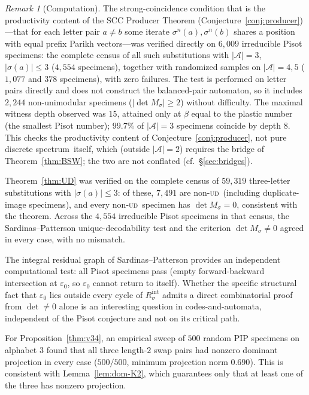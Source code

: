 \documentclass[11pt]{article}
\theoremstyle{plain}
\theoremstyle{definition}
\theoremstyle{remark}
\newtheorem{remark}[theorem]{Remark}
\newcommand{\UD}{\textsc{ud}}
\newcommand{\PDS}{pure discrete spectrum}
\newcommand{\A}{\mathcal{A}}
\begin{document}
\begin{remark}[Computation]\label{rem:computation}
The strong-coincidence condition that is the productivity content of the SCC Producer Theorem (Conjecture~\ref{conj:producer})---that for each letter pair $a\ne b$ some iterate $\sigma^n(a),\sigma^n(b)$ shares a position with equal prefix Parikh vectors---was verified directly on $6{,}009$ irreducible Pisot specimens: the complete census of all such substitutions with $|\A|=3$, $|\sigma(a)|\le 3$ ($4{,}554$ specimens), together with randomized samples on $|\A|=4,5$ ($1{,}077$ and $378$ specimens), with zero failures. The test is performed on letter pairs directly and does not construct the balanced-pair automaton, so it includes $2{,}244$ non-unimodular specimens ($|\det M_\sigma|\ge 2$) without difficulty. The maximal witness depth observed was $15$, attained only at $\beta$ equal to the plastic number (the smallest Pisot number); $99.7\%$ of $|\A|=3$ specimens coincide by depth $8$. This checks the productivity content of Conjecture~\ref{conj:producer}, not \PDS\ itself, which (outside $|\A|=2$) requires the bridge of Theorem~\ref{thm:BSW}; the two are not conflated (cf.\ \S\ref{sec:bridges}).

Theorem~\ref{thm:UD} was verified on the complete census of $59{,}319$ three-letter substitutions with $|\sigma(a)|\le 3$: of these, $7{,}491$ are non-\UD\ (including duplicate-image specimens), and every non-\UD\ specimen has $\det M_\sigma=0$, consistent with the theorem. Across the $4{,}554$ irreducible Pisot specimens in that census, the Sardinas--Patterson unique-decodability test and the criterion $\det M_\sigma\ne 0$ agreed in every case, with no mismatch.

The integral residual graph of Sardinas--Patterson provides an independent computational test: all Pisot specimens pass (empty forward-backward intersection at $\varepsilon_0$, so $\varepsilon_0$ cannot return to itself). Whether the specific structural fact that $\varepsilon_0$ lies outside every cycle of $R^{\mathrm{int}}_\sigma$ admits a direct combinatorial proof from $\det\ne 0$ alone is an interesting question in codes-and-automata, independent of the Pisot conjecture and not on its critical path.

For Proposition~\ref{thm:v34}, an empirical sweep of $500$ random PIP specimens on alphabet $3$ found that all three length-$2$ swap pairs had nonzero dominant projection in every case ($500/500$, minimum projection norm $0.690$). This is consistent with Lemma~\ref{lem:dom-K2}, which guarantees only that at least one of the three has nonzero projection.
\end{remark}
\end{document}
